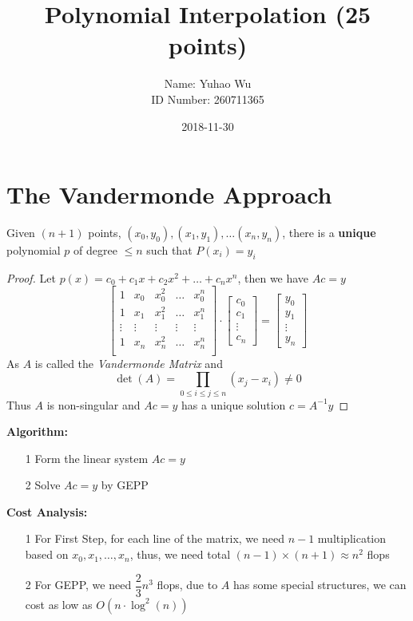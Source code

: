 \documentclass [9 pt]{article}
\theoremstyle{definition}
\begin{document}
\title{Polynomial Interpolation (25 points)}
\date{2018-11-30}
\author{Name: Yuhao Wu\\
ID Number: 260711365
}
\maketitle

\section*{The Vandermonde Approach}
Given $(n+1)$ points, $(x_0, y_0), (x_1, y_1), \ldots (x_n, y_n) $, there is a \textbf{ unique } polynomial $p$ of degree $\leq n$ such that $P(x_i) = y_i$
\begin{mdframed}
\begin{proof}

Let $p(x) = c_0 + c_1x + c_2 x^2 +  \ldots + c_n x^n$, then we have $A c = y$
$$\begin{bmatrix}
	1 & x_0 & x_0^2 &\ldots &x_0^n \\
	1 & x_1 & x_1^2 &\ldots &x_1^n \\
	\vdots&\vdots &\vdots &\vdots &\vdots\\
	1 & x_n & x_n^2 &\ldots &x_n^n \\
\end{bmatrix} \cdot \begin{bmatrix}
	c_0\\
	c_1\\
	\vdots\\
	c_n
\end{bmatrix} = \begin{bmatrix}
	y_0\\
	y_1\\
	\vdots\\
	y_n
\end{bmatrix}$$
As $A$ is called the \textit{ Vandermonde Matrix} and
$$ \det(A) = \prod_{ 0 \leq i\leq j \leq n}(x_j - x_i) \neq 0 $$		
Thus $A$ is non-singular and $Ac = y$ has a unique solution $c = A^{-1}y$
\end{proof}
\end{mdframed}
\textbf{Algorithm:}
\begin{itemize}
	\item[1] Form the linear system $Ac = y$ 
	\item[2] Solve $Ac = y$ by GEPP
\end{itemize}
\textbf{Cost Analysis:}
\begin{itemize}
	\item[1] For First Step, for each line of the matrix, we need $n - 1$ multiplication based on $x_0, x_1, \ldots, x_n$, thus, we need total $(n - 1) \times (n+1) \approx n^2$ flops
	\item[2] For GEPP, we need $\dfrac{2}{3}n^3$ flops, due to $A$ has some special structures, we can cost as low as $O(n \cdot \log^2(n))$
\end{itemize}
\end{document}
